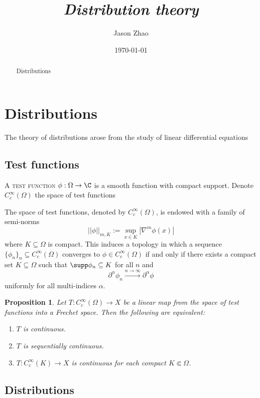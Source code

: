\documentclass[reqno]{amsart}
\title
{
	\emph{Distribution theory}
}
\author{Jason Zhao}
\date{\today}
\newtheorem{proposition}[theorem]{Proposition}
\theoremstyle{definition}
\theoremstyle{remark}
\renewcommand{\emph}{\textsc}
\begin{document}
\maketitle
\begin{abstract}
	Distributions
\end{abstract}

\tableofcontents

\section{Distributions}

The theory of distributions arose from the study of linear differential equations

\subsection{Test functions}

A \emph{test function} $\phi : \Omega \to \C$ is a smooth function with compact support. Denote $C^\infty_c (\Omega)$ the space of test functions

The space of test functions, denoted by $C^\infty_c (\Omega)$, is endowed with a family of semi-norms
	\[ ||\phi||_{m, K} := \sup_{x \in K} |\nabla^m \phi(x)| \]
where $K \subseteq \Omega$ is compact. This induces a topology in which a sequence $\{ \phi_n \}_n \subseteq C^\infty_c (\Omega)$ converges to $\phi \in C^\infty_c (\Omega)$ if and only if there exists a compact set $K \subseteq \Omega$ such that $\supp \phi_n \subseteq K$ for all $n$ and 
	\[ \partial^\alpha \phi_n  \overset{n \to \infty}{\longrightarrow}  \partial^\alpha \phi\]
uniformly for all multi-indices $\alpha$. 

\begin{proposition}
	Let $T: C^\infty_c (\Omega) \to X$ be a linear map from the space of test functions into a Frechet space. Then the following are equivalent:
	\begin{enumerate}
		\item $T$ is continuous. 
		\item $T$ is sequentially continuous. 
		\item $T : C^\infty_c (K) \to X$ is continuous for each compact $K \Subset \Omega$. 
	\end{enumerate}
\end{proposition}

\subsection{Distributions}
\end{document}
